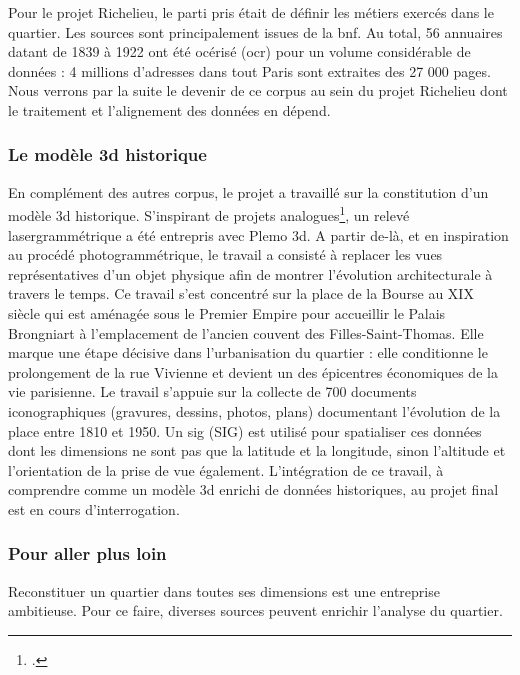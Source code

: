 Pour le projet Richelieu, le parti pris était de définir les métiers exercés dans le quartier. Les sources sont principalement issues de la \acrshort{bnf}. Au total, 56 annuaires datant de 1839 à 1922 ont été océrisé (\acrshort{ocr}) pour un volume considérable de données : 4 millions d'adresses dans tout Paris sont extraites des 27 000 pages. Nous verrons par la suite le devenir de ce corpus au sein du projet Richelieu dont le traitement et l'alignement des données en dépend. 

\subsubsection{Le modèle \acrshort{3d} historique}  
En complément des autres corpus, le projet a travaillé sur la constitution d'un modèle \acrshort{3d} historique. S'inspirant de projets analogues\footcite{GOUET-BRUNETIndexation2023a}, un relevé lasergrammétrique a été entrepris avec Plemo \acrshort{3d}. A partir de-là, et en inspiration au procédé photogrammétrique, le travail a consisté à replacer les vues représentatives d'un objet physique afin de montrer l'évolution architecturale à travers le temps. Ce travail s'est concentré sur la place de la Bourse au XIX\ieme~ siècle qui est aménagée sous le Premier Empire pour accueillir le Palais Brongniart à l'emplacement de l'ancien couvent des Filles-Saint-Thomas. Elle marque une étape décisive dans l'urbanisation du quartier : elle conditionne le prolongement de la rue Vivienne et devient un des épicentres économiques de la vie parisienne. Le travail s'appuie sur la collecte de 700 documents iconographiques (gravures, dessins, photos, plans) documentant l'évolution de la place entre 1810 et 1950. Un \acrlong{sig} (SIG) est utilisé pour spatialiser ces données dont les dimensions ne sont pas que la latitude et la longitude, sinon l'altitude et l'orientation de la prise de vue également. L'intégration de ce travail, à comprendre comme un modèle \acrshort{3d} enrichi de données historiques, au projet final est en cours d'interrogation. 

\subsubsection{Pour aller plus loin}
Reconstituer un quartier dans toutes ses dimensions est une entreprise ambitieuse. Pour ce faire, diverses sources peuvent enrichir l'analyse du quartier.

